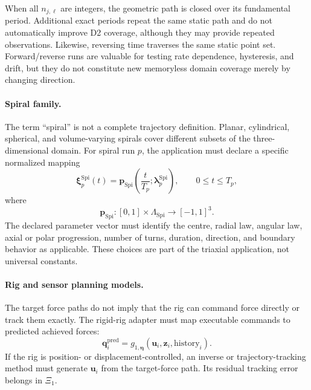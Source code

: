 \documentclass[11pt,a4paper]{article}
\begin{document}
When all $n_{j,\ell}$ are integers, the geometric path is closed over its
fundamental period. Additional exact periods repeat the same static path and
do not automatically improve D2 coverage, although they may provide repeated
observations. Likewise, reversing time traverses the same static point set.
Forward/reverse runs are valuable for testing rate dependence, hysteresis, and
drift, but they do not constitute new memoryless domain coverage merely by
changing direction.

\paragraph{Spiral family.}
The term ``spiral'' is not a complete trajectory definition. Planar,
cylindrical, spherical, and volume-varying spirals cover different subsets of
the three-dimensional domain. For spiral run $p$, the application must declare
a specific normalized mapping
\begin{equation}
    \boldsymbol{\xi}_{p}^{\mathrm{Spi}}(t)
    =
    \mathbf{p}_{\mathrm{Spi}}
    \left(
        \frac{t}{T_p};
        \boldsymbol{\lambda}_{p}^{\mathrm{Spi}}
    \right),
    \qquad
    0\leq t\leq T_p,
\end{equation}
where
\begin{equation}
    \mathbf{p}_{\mathrm{Spi}}
    :
    [0,1]
    \times
    \Lambda_{\mathrm{Spi}}
    \longrightarrow
    [-1,1]^3.
\end{equation}
The declared parameter vector must identify the centre, radial law, angular
law, axial or polar progression, number of turns, duration, direction, and
boundary behavior as applicable. These choices are part of the triaxial
application, not universal constants.

\paragraph{Rig and sensor planning models.}
The target force paths do not imply that the rig can command force directly or
track them exactly. The rigid-rig adapter must map executable commands to
predicted achieved forces:
\begin{equation}
    \mathbf{q}^{\mathrm{pred}}_i
    =
    g_{1,\boldsymbol{\eta}}
    \left(
        \mathbf{u}_i,
        \mathbf{z}_i,
        \text{history}_i
    \right).
\end{equation}
If the rig is position- or displacement-controlled, an inverse or
trajectory-tracking method must generate $\mathbf{u}_i$ from the target-force
path. Its residual tracking error belongs in $\Xi_1$.
\end{document}
